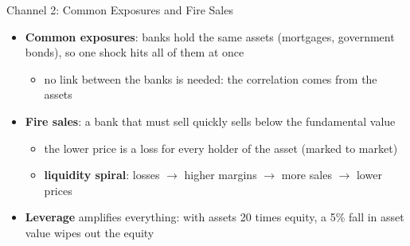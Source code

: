 \begin{frame}{Channel 2: Common Exposures and Fire Sales}
\itemsize{\small}
\begin{itemize}
    \item \textbf{Common exposures}: banks hold the same assets (mortgages, government bonds), so one shock hits all of them at once
    \begin{itemize}
        \item no link between the banks is needed: the correlation comes from the assets
    \end{itemize}
    \item \textbf{Fire sales}: a bank that must sell quickly sells below the fundamental value 
    \begin{itemize}
        \item the lower price is a loss for every holder of the asset (marked to market)
        \item \textbf{liquidity spiral}: losses $\to$ higher margins $\to$ more sales $\to$ lower prices 
    \end{itemize}
    \item \textbf{Leverage} amplifies everything: with assets 20 times equity, a 5\% fall in asset value wipes out the equity
\end{itemize}
\end{frame}

